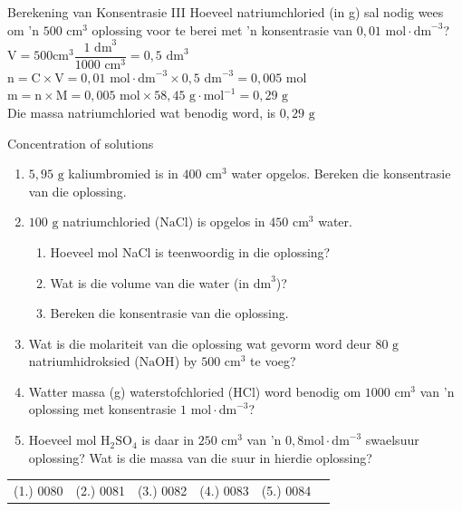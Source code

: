       \begin{wex}{Berekening van Konsentrasie III }
{
\label{m38712*id283476}Hoeveel natriumchloried (in g) sal nodig wees om 'n $500 {\text{ cm}}^{3}$ oplossing voor te berei met 'n konsentrasie van $0,01 \text{ mol} \cdot \text{dm}^{-3}$?
   }
{
$\text{V}= 500 \text{cm}^{3} \dfrac{1 \text{ dm}^{3}}{1 000 \text{ cm}^{3}}=0,5 {\text{ dm}}^{3}$
$\text{n}=\text{C} \times \text{V}= 0,01 \text{ mol} \cdot \text{dm}^{-3} \times 0,5 \text{ dm}^{-3} = 0,005 \text{ mol}$
$\text{m}=\text{n} \times \text{M}= 0,005 \text{ mol} \times 58,45 \text{ g} \cdot \text{mol}^{-1} = 0,29 \text{ g}$\\
Die massa natriumchloried wat benodig word, is $0,29 \text{ g}$ 
}
    \end{wex}
    \noindent
\label{m38712*secfhsst!!!underscore!!!id1879}
            \begin{exercises}{ Concentration of solutions
      }
            \nopagebreak \noindent
      \label{m38712*id283713}\begin{enumerate}[noitemsep, label=\textbf{\arabic*}. ] 
\item $5,95 \text{ g}$ kaliumbromied is in $400 {\text{ cm}}^{3}$ water opgelos. Bereken die konsentrasie van die oplossing.
\item $100 \text{ g}$ natriumchloried ($\text{NaCl}$) is opgelos in $450 {\text{ cm}}^{3}$ water.
  \begin{enumerate}[noitemsep, label=\textbf{\alph*}. ] 
    \item Hoeveel mol NaCl is teenwoordig in die oplossing?
    \item Wat is die volume van die water (in ${\text{dm}}^{3}$)?
    \item Bereken die konsentrasie van die oplossing.
\end{enumerate}
\item Wat is die molariteit van die oplossing wat gevorm word deur $80 \text{ g}$ natriumhidroksied ($\text{NaOH}$) by $500 {\text{ cm}}^{3}$ te voeg? 
\item Watter massa (g) waterstofchloried ($\text{HCl}$) word benodig om $1000 {\text{ cm}}^{3}$ van 'n oplossing met konsentrasie $1 \text{ mol} \cdot {\text{dm}}^{-3}$?
\item Hoeveel mol $\text{H}{}_{2}\text{SO}{}_{4}$ is daar in $250 {\text{ cm}}^{3}$ van 'n $0,8 \text{mol} \cdot \text{dm}^{-3}$ swaelsuur oplossing? Wat is die massa van die suur in hierdie oplossing?
\end{enumerate}
\practiceinfo
\par 
 \par \begin{tabular}[h]{cccccc}
 (1.) 0080  &  (2.) 0081  &  (3.) 0082  &  (4.) 0083  &  (5.) 0084  & \end{tabular}
\end{exercises}

